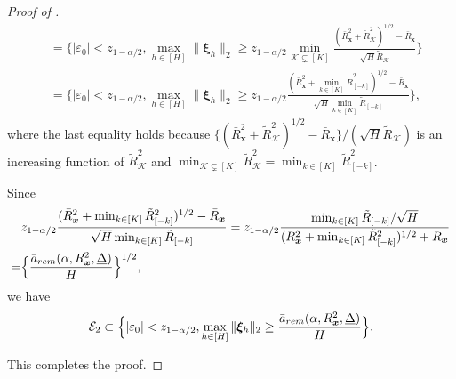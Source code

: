 \documentclass[10pt,a4paper]{amsart}
\newcommand{\bs}{\boldsymbol}
\newcommand{\mk}{\mathcal{K}}
\newcommand{\rem}{\textnormal{rem}}
\begin{document}
\begin{proof}[Proof of ]
\begin{align*}
    & = \Big\{|\varepsilon_0| < z_{1-\alpha/2}, \max_{h\in [H]} \|\bs{\xi}_{ h }\|_2 \geq  z_{1-\alpha/2} \min_{\mk \subsetneq [K]}\frac{(\bar{R}_{\bs{x}}^2 +\tilde{R}^2_{\mk})^{1/2}-\bar{R}_{\bs{x}} }{\sqrt{H}\tilde{R}_{\mk}}\Big\}\\
    & = \Big\{|\varepsilon_0| < z_{1-\alpha/2}, \max_{h\in [H]} \|\bs{\xi}_{ h }\|_2 \geq  z_{1-\alpha/2} \frac{(\bar{R}_{\bs{x}}^2 +\min_{k \in [K]} \tilde{R}^2_{[-k]})^{1/2}-\bar{R}_{\bs{x}} }{\sqrt{H} \min_{k \in [K]}\tilde{R}_{ [-k]}}\Big\},
\end{align*}
where the last equality holds because $\big\{(\bar{R}_{\bs{x}}^2 +\tilde{R}^2_{\mk})^{1/2}-\bar{R}_{\bs{x}} \big\}/(\sqrt{H}\tilde{R}_{\mk})$ is an increasing function of $\tilde{R}^2_{\mk}$ and $\min_{\mk \subsetneq [K]} \tilde{R}^2_{\mk} = \min_{k \in [K]}\tilde{R}_{ [-k]}^2$.

Since 
\begin{align*}
    & z_{1-\alpha/2}\frac{(\bar{R}_{\bs{x}}^2 +\min_{k \in [K]} \tilde{R}^2_{[-k]})^{1/2}-\bar{R}_{\bs{x}} }{\sqrt{H} \min_{k \in [K]}\tilde{R}_{ [-k]}} = z_{1-\alpha/2} \frac{\min_{k \in [K]} \tilde{R}_{ [-k]}/\sqrt{H}}{(\bar{R}_{\bs{x}}^2 + \min_{k \in [K]} \tilde{R}^2_{[-k]})^{1/2}+\bar{R}_{\bs{x}}} \\
    =& \Big\{\frac{\bar{a}_{\rem}(\alpha, R^2_{\bs{x}}, \underline{\Delta})}{H}\Big\}^{1/2},
\end{align*}
we have
\begin{align*}
    \mathcal{E}_2  \subset \Big\{|\varepsilon_0| < z_{1-\alpha/2}, \max_{h\in [H]} \|\bs{\xi}_{ h }\|_2 \geq  \frac{\bar{a}_{\rem}(\alpha, R^2_{\bs{x}}, \underline{\Delta})}{H}\Big\}.
\end{align*}


This completes the proof.
\end{proof}
\end{document}
